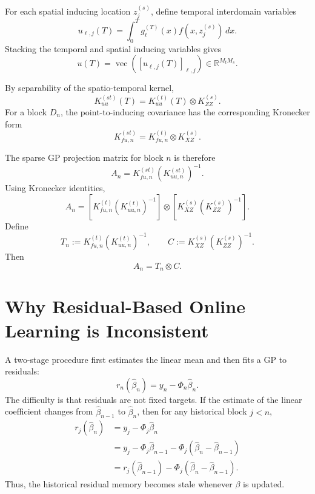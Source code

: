 \documentclass[12pt]{article}
\newcommand{\vecop}{\operatorname{vec}}
\begin{document}
For each spatial inducing location $z_j^{(s)}$, define temporal interdomain variables
\begin{equation}
u_{\ell,j}(T)
=
\int_0^T g_\ell^{(T)}(x)f(x,z_j^{(s)})\,dx.
\end{equation}
Stacking the temporal and spatial inducing variables gives
\begin{equation}
u(T)
=
\vecop\!\left([u_{\ell,j}(T)]_{\ell,j}\right)
\in\mathbb{R}^{M_tM_s}.
\end{equation}

By separability of the spatio-temporal kernel,
\begin{equation}
K_{uu}^{(st)}(T)
=
K_{uu}^{(t)}(T)
\otimes
K_{ZZ}^{(s)}.
\label{eq:mixed-inducing-cov}
\end{equation}
For a block $D_n$, the point-to-inducing covariance has the corresponding Kronecker
form
\begin{equation}
K_{fu,n}^{(st)}
=
K_{fu,n}^{(t)}
\otimes
K_{XZ}^{(s)}.
\label{eq:mixed-cross-cov}
\end{equation}

The sparse GP projection matrix for block $n$ is therefore
\begin{equation}
A_n
=
K_{fu,n}^{(st)}
\left(K_{uu,n}^{(st)}\right)^{-1}.
\label{eq:projection-general}
\end{equation}
Using Kronecker identities,
\begin{equation}
A_n
=
\left[
K_{fu,n}^{(t)}
\left(K_{uu,n}^{(t)}\right)^{-1}
\right]
\otimes
\left[
K_{XZ}^{(s)}
\left(K_{ZZ}^{(s)}\right)^{-1}
\right].
\label{eq:projection-kron}
\end{equation}
Define
\begin{equation}
T_n
:=
K_{fu,n}^{(t)}
\left(K_{uu,n}^{(t)}\right)^{-1},
\qquad
C
:=
K_{XZ}^{(s)}
\left(K_{ZZ}^{(s)}\right)^{-1}.
\label{eq:Tn-C-def}
\end{equation}
Then
\begin{equation}
A_n=T_n\otimes C.
\label{eq:A-kron}
\end{equation}

\section{Why Residual-Based Online Learning is Inconsistent}

A two-stage procedure first estimates the linear mean and then fits a GP to residuals:
\begin{equation}
r_n(\hat{\beta}_n)
=
y_n-\Phi_n\hat{\beta}_n.
\end{equation}
The difficulty is that residuals are not fixed targets. If the estimate of the linear
coefficient changes from $\hat{\beta}_{n-1}$ to $\hat{\beta}_{n}$, then for any historical
block $j<n$,
\begin{align}
r_j(\hat{\beta}_{n})
&=
y_j-\Phi_j\hat{\beta}_{n}
\\
&=
y_j-\Phi_j\hat{\beta}_{n-1}
-
\Phi_j(\hat{\beta}_{n}-\hat{\beta}_{n-1})
\\
&=
r_j(\hat{\beta}_{n-1})
-
\Phi_j(\hat{\beta}_{n}-\hat{\beta}_{n-1}).
\label{eq:residual-mismatch}
\end{align}
Thus, the historical residual memory becomes stale whenever $\beta$ is updated.
\end{document}
